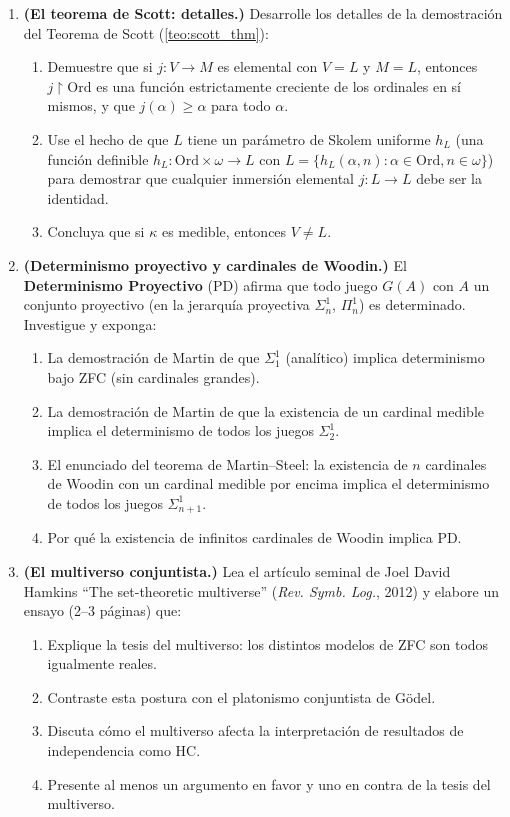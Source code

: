 \begin{enumerate}[leftmargin=2em, label=\textbf{P\arabic*$'$.}]

  \item \textbf{(El teorema de Scott: detalles.)} Desarrolle los detalles de la demostración del Teorema de Scott (\ref{teo:scott_thm}):
  \begin{enumerate}[label=(\alph*)]
    \item Demuestre que si $j: V \to M$ es elemental con $V = L$ y $M = L$, entonces $j\restriction \mathrm{Ord}$ es una función estrictamente creciente de los ordinales en sí mismos, y que $j(\alpha) \geq \alpha$ para todo $\alpha$.
    \item Use el hecho de que $L$ tiene un parámetro de Skolem uniforme $h_L$ (una función definible $h_L: \mathrm{Ord} \times \omega \to L$ con $L = \{h_L(\alpha, n) : \alpha \in \mathrm{Ord}, n \in \omega\}$) para demostrar que cualquier inmersión elemental $j: L \to L$ debe ser la identidad.
    \item Concluya que si $\kappa$ es medible, entonces $V \neq L$.
  \end{enumerate}

  \item \textbf{(Determinismo proyectivo y cardinales de Woodin.)} El \textbf{Determinismo Proyectivo} (PD) afirma que todo juego $G(A)$ con $A$ un conjunto proyectivo (en la jerarquía proyectiva $\Sigma^1_n$, $\Pi^1_n$) es determinado. Investigue y exponga:
  \begin{enumerate}[label=(\alph*)]
    \item La demostración de Martin de que $\Sigma^1_1$ (analítico) implica determinismo bajo ZFC (sin cardinales grandes).
    \item La demostración de Martin de que la existencia de un cardinal medible implica el determinismo de todos los juegos $\Sigma^1_2$.
    \item El enunciado del teorema de Martin--Steel: la existencia de $n$ cardinales de Woodin con un cardinal medible por encima implica el determinismo de todos los juegos $\Sigma^1_{n+1}$.
    \item Por qué la existencia de infinitos cardinales de Woodin implica PD.
  \end{enumerate}

  \item \textbf{(El multiverso conjuntista.)} Lea el artículo seminal de Joel David Hamkins ``The set-theoretic multiverse'' (\textit{Rev. Symb. Log.}, 2012) y elabore un ensayo (2--3 páginas) que:
  \begin{enumerate}[label=(\alph*)]
    \item Explique la tesis del multiverso: los distintos modelos de ZFC son todos igualmente reales.
    \item Contraste esta postura con el platonismo conjuntista de Gödel.
    \item Discuta cómo el multiverso afecta la interpretación de resultados de independencia como HC.
    \item Presente al menos un argumento en favor y uno en contra de la tesis del multiverso.
  \end{enumerate}


\end{enumerate}
